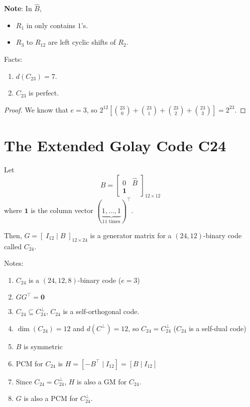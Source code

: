 \textbf{Note}: In $ \hat{B} $,
\begin{itemize}
    \item $ R_1 $ in only contains $ 1 $'s.
    \item $ R_3 $ to $ R_{12} $ are left cyclic shifts of $ R_2 $.
\end{itemize}

\begin{thmbox}
    \begin{theorem}
        Facts:
        \begin{enumerate}
            \item $ d(C_{23})=7 $.
            \item $ C_{23} $ is perfect.
        \end{enumerate}
    \end{theorem}
\end{thmbox}

\begin{proof}
    We know that $ e=3 $, so
    $ 2^{12}\left[ \binom{23}{0}+\binom{23}{1}+\binom{23}{2}+\binom{23}{3} \right]=
        2^{23} $.
\end{proof}

\section{The Extended Golay Code C24}
Let
\[ B=
    \left[
        \begin{array}{c|c}
            0 & \hat{B} \\
            \bm{1}
        \end{array}
        \right]_{12\times{} 12}
\]
where $ \bm{1} $ is the column vector $ (\underbrace{1,\ldots ,1}_{11\text{ times}})^\top $.

Then, $ G=\left[\; I_{12}\mid B \;\right]_{12\times 24} $ is a generator
matrix for a $ (24,12) $-binary code called $ C_{24} $.

Notes:
\begin{enumerate}[label=(\roman*)]
    \item $ C_{24} $ is a $ (24,12,8) $-binary code ($ e=3 $)
    \item $ GG^\top=\bm{0} $
    \item $ C_{24}\subseteq C_{24}^\perp $, $ C_{24} $ is a self-orthogonal code.
    \item $ \dim (C_{24})=12 $ and $ d(C^{\perp})=12 $, so
          $ C_{24}=C_{24}^\perp $ ($ C_{24} $ is a self-dual code)
    \item $ B $ is symmetric
    \item PCM for $ C_{24} $ is $ H=\left[ -B ^\top \mid I_{12} \right]=
              \left[ B\mid I_{12} \right] $
    \item Since $ C_{24}=C_{24}^\perp $, $ H $ is also a GM for $ C_{24} $.
    \item $ G $ is also a PCM for $ C_{24}^\perp $.
\end{enumerate}

